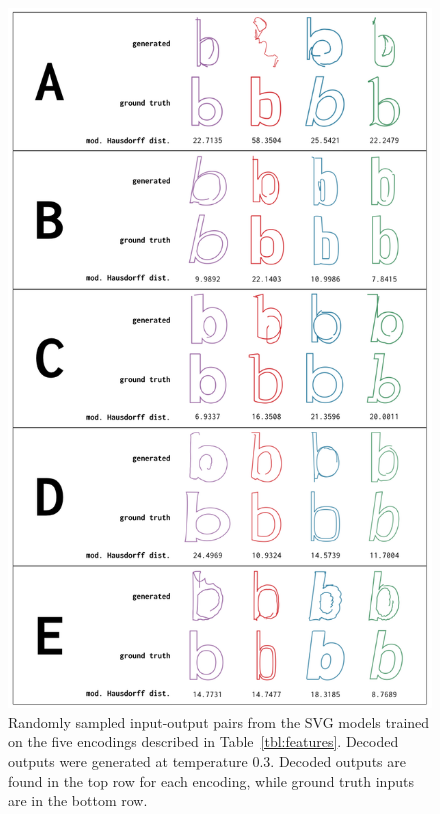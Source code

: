 \begin{figure}[t]
    \centering
	\includegraphics[height=0.8\textheight]{figures/encodings}
    \caption[Visual results of training the SVG model with different encodings]{Randomly sampled input-output pairs from the SVG models trained on the five encodings described in Table~\ref{tbl:features}. Decoded outputs were generated at temperature 0.3. Decoded outputs are found in the top row for each encoding, while ground truth inputs are in the bottom row.\label{fig:encodings}}
\end{figure}
